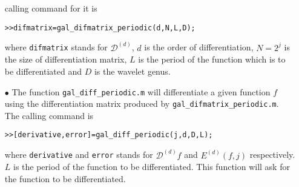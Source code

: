 \documentclass[acmtoms]{acmtrans2m}
\begin{document}
\begin{itemize}
calling command for it is
\begin{alltt}
 >>difmatrix=gal_difmatrix_periodic(d,N,L,D);
\end{alltt}
where \verb#difmatrix# stands for $\mathcal{D}^{(d)}$, $d$ is the order of differentiation, $N=2^j$ is
the size of differentiation matrix, $L$ is the period of the
function which is to be differentiated and $D$ is the wavelet genus.
\item[$\bullet$]
The function \verb#gal_diff_periodic.m# will differentiate a given function $f$ using the differentiation matrix produced by \verb#gal_difmatrix_periodic.m#. The calling command is
\begin{alltt}
>>[derivative, error] = gal_diff_periodic(j,d,D,L);
\end{alltt}
where \verb#derivative# and \verb#error# stands for $\mathcal{D}^{(d)}f$ and $E^{(d)}(f,j)$ respectively. $L$ is the period of the function to be differentiated. This function will ask for the function to be differentiated.
\end{itemize}
\end{document}
